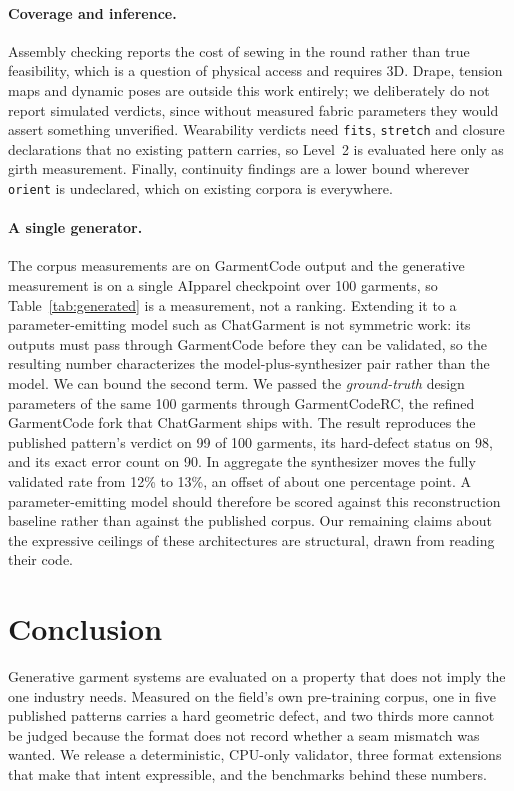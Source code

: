 \documentclass[10pt,twocolumn]{article}
\newcommand{\code}[1]{\texttt{\small #1}}
\begin{document}
\paragraph{Coverage and inference.} Assembly checking reports the cost of
sewing in the round rather than true feasibility, which is a question of
physical access and requires 3D. Drape, tension maps and dynamic poses are
outside this work entirely; we deliberately do not report simulated verdicts,
since without measured fabric parameters they would assert something unverified.
Wearability verdicts need \code{fits}, \code{stretch} and closure
declarations that no existing pattern carries, so Level~2 is evaluated here
only as girth measurement. Finally, continuity findings are a lower bound
wherever \code{orient} is undeclared, which on existing corpora is everywhere.

\paragraph{A single generator.} The corpus measurements
are on GarmentCode output and the generative measurement is on a single AIpparel
checkpoint over 100 garments, so Table~\ref{tab:generated} is a measurement, not
a ranking. Extending it to a parameter-emitting model such as ChatGarment is not
symmetric work: its outputs must pass through GarmentCode before they can be
validated, so the resulting number characterizes the model-plus-synthesizer pair
rather than the model. We can bound the second term. We passed the
\emph{ground-truth} design parameters of the same 100 garments through
GarmentCodeRC, the refined GarmentCode fork that ChatGarment ships with. The
result reproduces the published pattern's verdict on 99 of 100 garments, its
hard-defect status on 98, and its exact error count on 90. In aggregate the
synthesizer moves the fully validated rate from 12\% to 13\%, an offset of
about one percentage point. A parameter-emitting model should therefore be
scored against this reconstruction baseline rather than against the published
corpus. Our remaining claims about the expressive ceilings of these
architectures are structural, drawn from reading their code.

\section{Conclusion}

Generative garment systems are evaluated on a property that does not imply the
one industry needs. Measured on the field's own pre-training corpus, one in
five published patterns carries a hard geometric defect, and two thirds more
cannot be judged because the format does not record whether a seam mismatch
was wanted.
We release a deterministic, CPU-only validator, three format extensions that
make that intent expressible, and the benchmarks behind these numbers.
\end{document}

